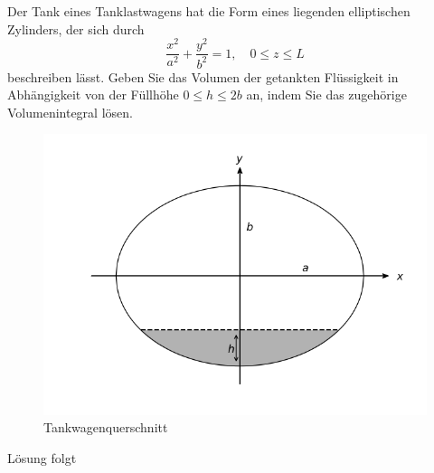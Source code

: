 \documentclass{atistandalonetask}
\begin{document}
  \begin{atiTask}[
    title = Füllung eines Tankwagens
  ]
  
  Der Tank eines Tanklastwagens hat die Form eines liegenden elliptischen Zylinders, der sich durch
  \[
  \frac{x^2}{a^2}+\frac{y^2}{b^2}=1,\quad 0\leq z\leq L
  \]
  beschreiben lässt. Geben Sie das Volumen der getankten Flüssigkeit in Abhängigkeit von der Füllhöhe $0\leq h\leq 2b$ an, indem Sie das zugehörige Volumenintegral lösen.
  \begin{figure}[H]
\centering
\includegraphics[width=0.7\linewidth]{./picture-doppelintegral_iii}
\caption{Tankwagenquerschnitt}

\end{figure}

  	
  \end{atiTask}
  \begin{atiSolution}
   	Lösung folgt
  \end{atiSolution}
\end{document}
